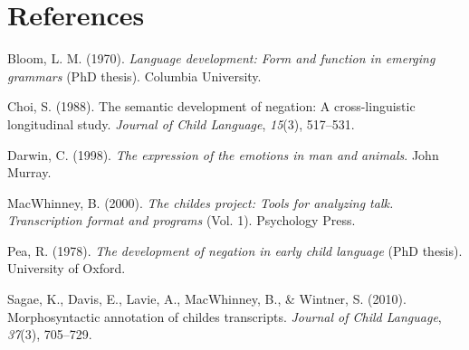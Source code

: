 \documentclass[10pt, letterpaper]{article}
\begin{document}
\hypertarget{references}{%
\section{References}\label{references}}

\setlength{\parindent}{-0.1in} 
\setlength{\leftskip}{0.125in}

\noindent

\hypertarget{refs}{}
\leavevmode\hypertarget{ref-bloom1970language}{}%
Bloom, L. M. (1970). \emph{Language development: Form and function in
emerging grammars} (PhD thesis). Columbia University.

\leavevmode\hypertarget{ref-choi1988semantic}{}%
Choi, S. (1988). The semantic development of negation: A
cross-linguistic longitudinal study. \emph{Journal of Child Language},
\emph{15}(3), 517--531.

\leavevmode\hypertarget{ref-darwin1872expression}{}%
Darwin, C. (1998). \emph{The expression of the emotions in man and
animals}. John Murray.

\leavevmode\hypertarget{ref-macwhinney2000childes}{}%
MacWhinney, B. (2000). \emph{The childes project: Tools for analyzing
talk. Transcription format and programs} (Vol. 1). Psychology Press.

\leavevmode\hypertarget{ref-pea1978}{}%
Pea, R. (1978). \emph{The development of negation in early child
language} (PhD thesis). University of Oxford.

\leavevmode\hypertarget{ref-sagae2010morphosyntactic}{}%
Sagae, K., Davis, E., Lavie, A., MacWhinney, B., \& Wintner, S. (2010).
Morphosyntactic annotation of childes transcripts. \emph{Journal of
Child Language}, \emph{37}(3), 705--729.


\end{document}
